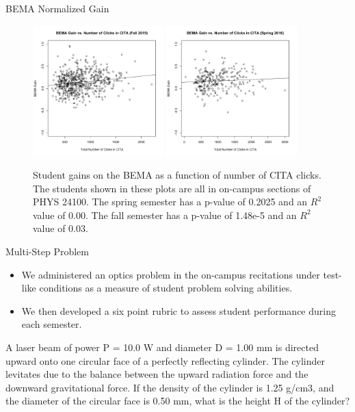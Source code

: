 \documentclass[xcolor=x11names,compress]{beamer}
\begin{document}
\begin{frame}{BEMA Normalized Gain}
	\begin{figure}[ht]
		\centering
		\includegraphics[width=0.45\textwidth]{img/bema_fa15_gain.pdf}
		\includegraphics[width=0.45\textwidth]{img/bema_sp16_gain.pdf}
		\caption{Student gains on the BEMA as a function of number of CITA clicks. The students shown in these plots are all in on-campus sections of PHYS 24100. The spring semester has a p-value of 0.2025 and an $R^2$ value of 0.00. The fall semester has a p-value of 1.48e-5 and an $R^2$ value of 0.03.}
	\end{figure}
\end{frame}

\begin{frame}{Multi-Step Problem}
	\begin{itemize}
		\item We administered an optics problem in the on-campus recitations under test-like conditions as a measure of student problem solving abilities.
		\item We then developed a six point rubric to assess student performance during each semester.
	\end{itemize}
	\vspace{1mm}
	\noindent\makebox[\linewidth]{\rule{12cm}{0.4pt}}
	
	{\small A laser beam of power P = 10.0 W and diameter D = 1.00 mm is directed upward onto one circular face of a perfectly reflecting cylinder. The cylinder levitates due to the balance between the upward radiation force and the downward gravitational force. If the density of the cylinder is 1.25 g/cm3, and the diameter of the circular face is 0.50 mm, what is the height H of the cylinder?}
\end{frame}
\end{document}
